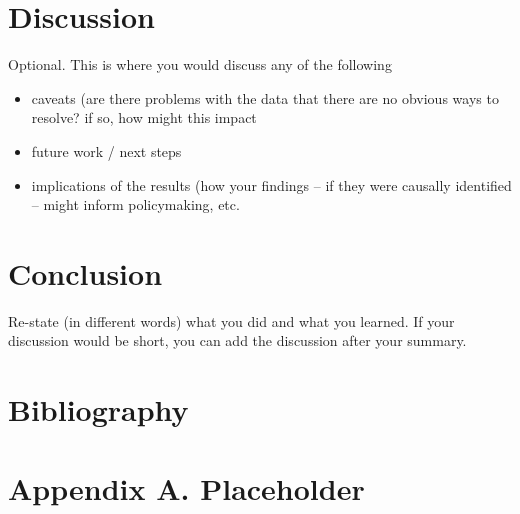 \documentclass{article}
\begin{document}
    


\section{Discussion}
\label{sec:discussion}

Optional. This is where you would discuss any of the following
\begin{itemize}
    \item caveats (are there problems with the data that there are no obvious ways to resolve? if so, how might this impact
    \item future work / next steps
    \item implications of the results (how your findings -- if they were causally identified -- might inform policymaking, etc.
\end{itemize}

\section{Conclusion}
\label{sec:conclusion}

Re-state (in different words) what you did and what you learned. If your discussion would be short, you can add the discussion after your summary.

\newpage
\section*{Bibliography}
\singlespacing
\setlength\bibsep{0pt}


\newpage
\section*{Appendix A. Placeholder} \label{sec:appendixa}
\end{document}
